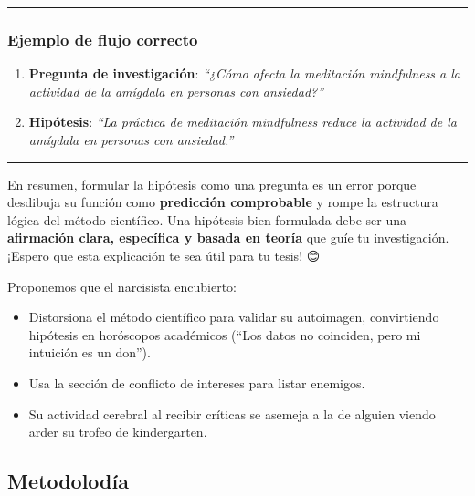 \documentclass[
]{article}
\providecommand{\tightlist}{%
  \setlength{\itemsep}{0pt}\setlength{\parskip}{0pt}}\usepackage{longtable,booktabs,array}
\begin{document}
\begin{tcolorbox}
\begin{center}\rule{0.5\linewidth}{0.5pt}\end{center}

\subsubsection{\texorpdfstring{\textbf{Ejemplo de flujo
correcto}}{Ejemplo de flujo correcto}}\label{ejemplo-de-flujo-correcto}

\begin{enumerate}
\def\labelenumi{\arabic{enumi}.}
\tightlist
\item
  \textbf{Pregunta de investigación}: \emph{``¿Cómo afecta la meditación
  mindfulness a la actividad de la amígdala en personas con
  ansiedad?''}\\
\item
  \textbf{Hipótesis}: \emph{``La práctica de meditación mindfulness
  reduce la actividad de la amígdala en personas con ansiedad.''}
\end{enumerate}

\begin{center}\rule{0.5\linewidth}{0.5pt}\end{center}

En resumen, formular la hipótesis como una pregunta es un error porque
desdibuja su función como \textbf{predicción comprobable} y rompe la
estructura lógica del método científico. Una hipótesis bien formulada
debe ser una \textbf{afirmación clara, específica y basada en teoría}
que guíe tu investigación. ¡Espero que esta explicación te sea útil para
tu tesis! 😊

\end{tcolorbox}

Proponemos que el narcisista encubierto:

\begin{itemize}
\tightlist
\item
  Distorsiona el método científico para validar su autoimagen,
  convirtiendo hipótesis en horóscopos académicos (``Los datos no
  coinciden, pero mi intuición es un don'').
\item
  Usa la sección de conflicto de intereses para listar enemigos.
\item
  Su actividad cerebral al recibir críticas se asemeja a la de alguien
  viendo arder su trofeo de kindergarten.
\end{itemize}

\subsection{Metodolodía}\label{metodoloduxeda}
\end{document}
